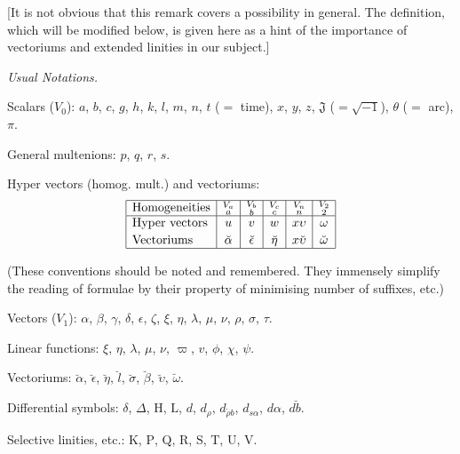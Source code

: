 \documentclass[11pt]{article}
\begin{document}
[It is not obvious that this remark covers a possibility in general. The
definition, which will be modified below, is given here as a hint of the
importance of vectoriums and extended linities in our subject.]

\begin{center}
  \textit{Usual Notations.}
\end{center}

\noindent Scalars ($V_0$): $a$, $b$, $c$, $g$, $h$, $k$, $l$, $m$, $n$,
$t$ ($=$ time), $x$, $y$, $z$, $\mathfrak{J}$ ($=\sqrt{-1}$), $\theta$
($=$ arc), $\pi$.

\noindent General multenions: $p$, $q$, $r$, $s$.

\noindent Hyper vectors (homog. mult.) and vectoriums:
\[
\begin{array}{|l|c|c|c|c|c|}\hline
\text{Homogeneities} & \substack{V_a\\a} & \substack{V_b\\b} & \substack{V_c\\c} & \substack{V_n\\n} & \substack{V_2\\2}\\ \hline
\text{Hyper vectors} & u & v & w & x\upsilon & \omega \\[2pt]
\text{Vectoriums} & \breve{\alpha} & \breve{\epsilon} & \breve{\eta} & x\breve{\upsilon} & \breve{\omega} \\ \hline
\end{array}
\]

\noindent (These conventions should be noted and remembered. They immensely
simplify the reading of formulae by their property of minimising number of
suffixes, etc.)

\noindent Vectors ($V_1$): $\alpha$, $\beta$, $\gamma$, $\delta$, $\epsilon$,
$\zeta$, $\xi$, $\eta$, $\lambda$, $\mu$, $\nu$, $\rho$, $\sigma$, $\tau$.

\noindent Linear functions: $\xi$, $\eta$, $\lambda$, $\mu$, $\nu$, $\varpi$,
$v$, $\phi$, $\chi$, $\psi$.

\noindent Vectoriums: $\breve{\alpha}$, $\breve{\epsilon}$, $\breve{\eta}$,
$\breve{l}$, $\breve{\sigma}$, $\breve{\beta}$, $\breve{\upsilon}$, $\breve{\omega}$.

\noindent Differential symbols: $\delta$, $\Delta$, $\mathrm{H}$, $\mathrm{L}$,
$d$, $d_\rho$, $d_{\breve{\rho}b}$, $d_{s\alpha}$, $d\alpha$, $d\breve{b}$.

\noindent Selective linities, etc.: $\mathrm{K}$, $\mathrm{P}$, $\mathrm{Q}$,
$\mathrm{R}$, $\mathrm{S}$, $\mathrm{T}$, $\mathrm{U}$, $\mathrm{V}$.
\end{document}
